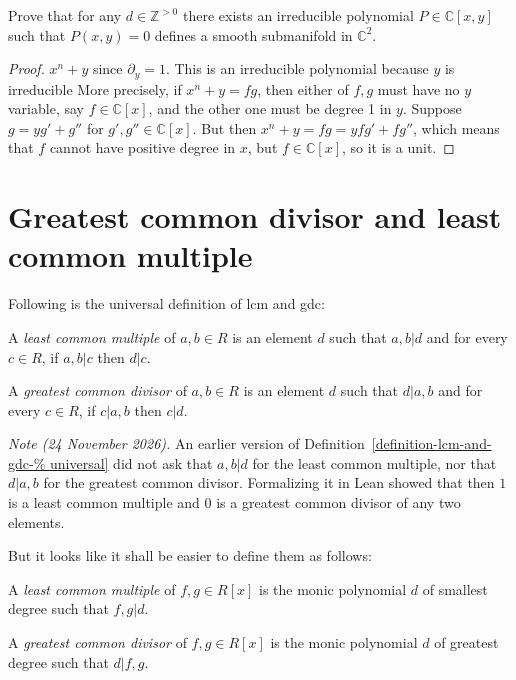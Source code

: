 \begin{exercise}
\label{exercise-smooth-irreducible-plane}
Prove that for any $d \in  \mathbb{Z}^{>0}$
there exists an irreducible polynomial
$P \in \mathbb{C}[x,y]$ such that
$P(x,y)=0$ defines a smooth submanifold
in $\mathbb{C}^2$.
\end{exercise}

\begin{proof}
$x^n+y$ since $\partial_y =1$.
This is an irreducible polynomial
because $y$ is irreducible
More precisely,
if $x^n+y = fg$, then either of $f,g$
must have no $y$ variable, say $f \in
\mathbb{C}[x]$,
and the other one must be degree 1 in $y$.
Suppose $g = y g' + g''$ for $g',g'' \in
\mathbb{C}[x]$. But then
$x^n+y = fg = yfg' + f g''$,
which means that $f$ cannot have positive
degree in $x$, but $f \in \mathbb{C}[x]$,
so it is a unit.
\end{proof}


\section{Greatest common divisor and least
common multiple}
\label{section-gcd-and-lcm}

Following is the universal definition of lcm
and gdc:

\begin{definition}
\label{definition-lcm-and-gdc-%
universal}
A {\it least common multiple} of $a,b \in R$
is an element $d$ such that $a,b|d$ and
for every $c\in R$, if $a,b|c$ then $d|c$.

A {\it greatest common divisor} of $a,b \in
R$ is an element $d$ such that $d|a,b$ and
for every  $c \in R$,  if $c|a,b$ then
$c|d$.
\end{definition}

\medskip\noindent
{\it Note (24 November 2026).}
An earlier version of
Definition~\ref{definition-lcm-and-gdc-%
universal}
did not ask that $a,b|d$
for the least common multiple,
nor that $d|a,b$ for the greatest
common divisor.
Formalizing it in Lean showed that then
$1$ is a least common multiple and $0$ is
a greatest common divisor
of any two elements.

But it looks like it shall be easier to
define them
as follows:

\begin{definition}
\label{definition-lcm-and-gdc-%
polynomial}
A {\it least common multiple} of $f,g \in
R[x]$ is the monic polynomial $d$ of
smallest degree such that $f,g|d$.

A {\it greatest common divisor} of $f,g\in
R[x]$ is the monic polynomial $d$ of
greatest degree such that $d|f,g$.
\end{definition}

